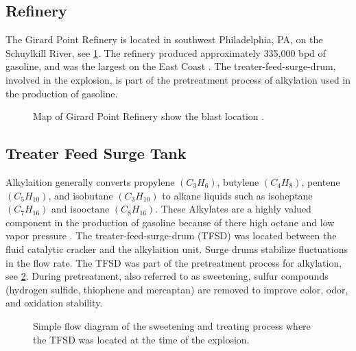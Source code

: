 \documentclass[10pt,parskip=half,
toc=sectionentrywithdots,
bibliography=totocnumbered,
captions=tableheading,numbers=noendperiod]{scrartcl}
\begin{document}
\hypertarget{refinery}{%
\subsection{Refinery}\label{refinery}}

The Girard Point Refinery is located in southwest Philadelphia, PA, on
the Schuylkill River, see \cref{fig:map}. The refinery produced
approximately 335,000 bpd of gasoline, and was the largest on the East
Coast \cite{AssociatedPress2019}. The treater-feed-surge-drum, involved
in the explosion, is part of the pretreatment process of alkylation used
in the production of gasoline.

\begin{figure}[H]
\hypertarget{fig:map}{%
\begin{center}
\end{center}
\caption{Map of Girard Point Refinery show the blast location
\cite{Duchneskie2019}.}\label{fig:map}
}
\end{figure}

\hypertarget{treater-feed-surge-tank}{%
\subsection{Treater Feed Surge Tank}\label{treater-feed-surge-tank}}

Alkylaition generally converts propylene \((C_3H_6)\), butylene
\((C_4H_8)\), pentene \((C_5H_{10})\), and isobutane \((C_3H_{10})\) to
alkane liquids such as isoheptane \((C_7H_{16})\) and isooctane
\((C_8H_{16})\). These Alkylates are a highly valued component in the
production of gasoline because of there high octane and low vapor
pressure \cite{flowserve2000}. The treater-feed-surge-drum (TFSD) was
located between the fluid catalytic cracker and the alkylaition unit.
Surge drums stabilize fluctuations in the flow rate. The TFSD was part
of the pretreatment process for alkylation, see
\cref{fig:fig_process_flow}. During pretreatment, also referred to as
sweetening, sulfur compounds (hydrogen sulfide, thiophene and mercaptan)
are removed to improve color, odor, and oxidation stability.

\begin{figure}[H]
\hypertarget{fig:fig_process_flow}{%
\begin{center}
\end{center}
\caption{Simple flow diagram of the sweetening and treating process where the
TFSD was located at the time of the explosion.
\cite{Temur2014,Malone2019}}\label{fig:fig_process_flow}
}
\end{figure}
\end{document}
